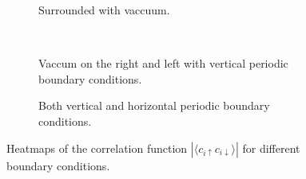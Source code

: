 \documentclass[../main.tex]{subfile}
\begin{document}
\begin{figure}[H]
    \centering
    \begin{subfigure}{0.3\textwidth}
        \centering
        
        \caption{Surrounded with vaccuum.}
        \label{fig:first}
    \end{subfigure}\\
    \begin{subfigure}{0.45\textwidth}
        \centering
        
        \caption{Vaccum on the right and left with vertical periodic boundary conditions.}
        \label{fig:first}
    \end{subfigure}
    \begin{subfigure}{0.45\textwidth}
        \centering
        
        \caption{Both vertical and horizontal periodic boundary conditions.}
        \label{fig:first}
    \end{subfigure}
    \caption{Heatmaps of the correlation function $|\langle c_{i\uparrow} c_{i\downarrow}\rangle|$ for different boundary conditions.}
\end{figure}
\end{document}
